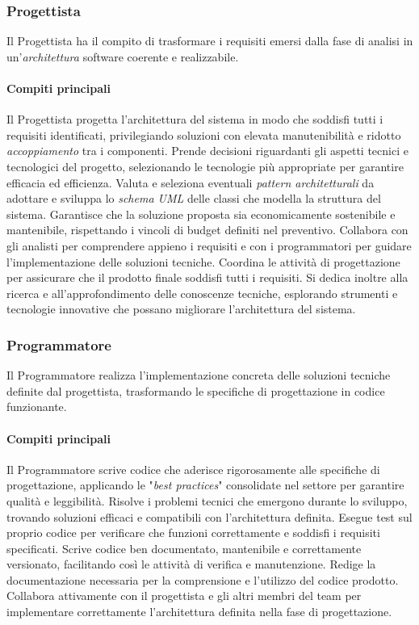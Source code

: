 \documentclass[a4paper, 11pt, oneside]{scrartcl} %
\begin{document}
\subsubsection{Progettista}
Il Progettista ha il compito di trasformare i requisiti emersi dalla fase di analisi in un'\emph{architettura}{\scriptsize{}} software coerente e realizzabile.

\paragraph{Compiti principali}
Il Progettista progetta l'architettura del sistema in modo che soddisfi tutti i requisiti identificati, privilegiando soluzioni con elevata manutenibilità e ridotto \emph{accoppiamento{\scriptsize{}}} tra i componenti.
Prende decisioni riguardanti gli aspetti tecnici e tecnologici del progetto, selezionando le tecnologie più appropriate per garantire efficacia ed efficienza.
Valuta e seleziona eventuali \emph{pattern architetturali{\scriptsize{}}} da adottare e sviluppa lo \emph{schema UML{\scriptsize{}}} delle classi che modella la struttura del sistema.
Garantisce che la soluzione proposta sia economicamente sostenibile e mantenibile, rispettando i vincoli di budget definiti nel preventivo.
Collabora con gli analisti per comprendere appieno i requisiti e con i programmatori per guidare l'implementazione delle soluzioni tecniche.
Coordina le attività di progettazione per assicurare che il prodotto finale soddisfi tutti i requisiti.
Si dedica inoltre alla ricerca e all'approfondimento delle conoscenze tecniche, esplorando strumenti e tecnologie innovative che possano migliorare l'architettura del sistema.

\subsubsection{Programmatore}
Il Programmatore realizza l'implementazione concreta delle soluzioni tecniche definite dal progettista, trasformando le specifiche di progettazione in codice funzionante.

\paragraph{Compiti principali}
Il Programmatore scrive codice che aderisce rigorosamente alle specifiche di progettazione, applicando le "\emph{best practices{\scriptsize{}}}" consolidate nel settore per garantire qualità e leggibilità.
Risolve i problemi tecnici che emergono durante lo sviluppo, trovando soluzioni efficaci e compatibili con l'architettura definita.
Esegue test sul proprio codice per verificare che funzioni correttamente e soddisfi i requisiti specificati.
Scrive codice ben documentato, mantenibile e correttamente versionato, facilitando così le attività di verifica e manutenzione.
Redige la documentazione necessaria per la comprensione e l'utilizzo del codice prodotto.
Collabora attivamente con il progettista e gli altri membri del team per implementare correttamente l'architettura definita nella fase di progettazione.
\end{document}

